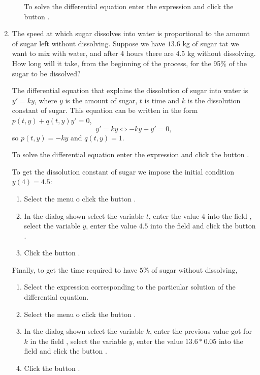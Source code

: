 \begin{enumerate}[leftmargin=*]
\begin{enumerate}
\begin{indication}
To solve the differential equation enter the expression  and click the button .
\end{indication}
\end{enumerate}

\item The speed at which sugar dissolves into water is proportional to the amount of sugar left without dissolving. 
Suppose we have $13.6$ kg of sugar tat we want to mix with water, and after 4 hours there are 4.5 kg without dissolving.
How long will it take, from the beginning of the process, for the 95\% of the sugar to be dissolved?
\begin{indication}
The differential equation that explains the dissolution of sugar into water is $y'=ky$, where $y$ is the amount of sugar, $t$ is time and $k$ is the dissolution constant of sugar. 
This equation can be written in the form $p(t,y)+q(t,y)y'=0$,
\[
y'=ky \Leftrightarrow -ky+y'=0,
\]
so $p(t,y)=-ky$ and $q(t,y)=1$.

To solve the differential equation enter the expression  and click the button .

To get the dissolution constant of sugar we impose the initial condition $y(4)=4.5$:
\begin{enumerate}
\item Select the menu  o click the button .
\item In the dialog shown select the variable $t$, enter the value $4$ into the field , select the variable $y$, enter the value $4.5$ into the field  and click the
button .
\item Click the button .
\end{enumerate}

Finally, to get the time required to have $5\%$ of sugar without dissolving, 
\begin{enumerate}[resume]
\item Select the expression corresponding to the particular solution of the differential equation. 
\item Select the menu  o click the button .
\item In the dialog shown select the variable $k$, enter the previous value got for $k$ in the field ,  select the variable $y$, enter the value $13.6*0.05$ into the field  and click the
button .
\item Click the button .
\end{enumerate}
\end{indication}

\end{enumerate}


